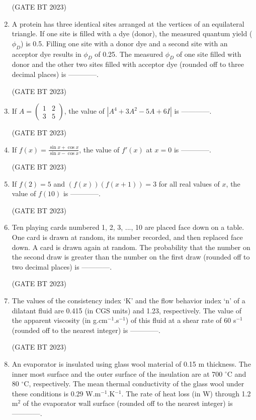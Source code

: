 \documentclass[journal,12pt,onecolumn]{IEEEtran}
\begin{document}
\begin{enumerate}
    \hfill(GATE BT 2023)

    \item A protein has three identical sites arranged at the vertices of an equilateral triangle. If one site is filled with a dye (donor), the measured quantum yield ($\phi_D$) is 0.5. Filling one site with a donor dye and a second site with an acceptor dye results in $\phi_D$ of 0.25. The measured $\phi_D$ of one site filled with donor and the other two sites filled with acceptor dye (rounded off to three decimal places) is ------------.

    \hfill(GATE BT 2023)

    \item If $A = \begin{pmatrix} 1 & 2 \\ 3 & 5 \end{pmatrix}$, the value of $|A^4 + 3A^2 - 5A + 6I|$ is ------------.

    \hfill(GATE BT 2023)

    \item If $f(x) = \frac{\sin x + \cos x}{\sin x - \cos x}$, the value of $f'(x)$ at $x = 0$ is ------------.

    \hfill(GATE BT 2023)

    \item If $f(2) = 5$ and $(f(x))(f(x+1)) = 3$ for all real values of $x$, the value of $f(10)$ is ------------.

    \hfill(GATE BT 2023)

    \item Ten playing cards numbered 1, 2, 3, ..., 10 are placed face down on a table. One card is drawn at random, its number recorded, and then replaced face down. A card is drawn again at random. The probability that the number on the second draw is greater than the number on the first draw (rounded off to two decimal places) is ------------.

    \hfill(GATE BT 2023)

    \item The values of the consistency index ‘K’ and the flow behavior index ‘n’ of a dilatant fluid are 0.415 (in CGS units) and 1.23, respectively. The value of the apparent viscosity (in g.cm$^{-1}$.s$^{-1}$) of this fluid at a shear rate of 60 s$^{-1}$ (rounded off to the nearest integer) is ------------.

    \hfill(GATE BT 2023)

    \item An evaporator is insulated using glass wool material of 0.15 m thickness. The inner most surface and the outer surface of the insulation are at 700 $^\circ$C and 80 $^\circ$C, respectively. The mean thermal conductivity of the glass wool under these conditions is 0.29 W.m$^{-1}$.K$^{-1}$. The rate of heat loss (in W) through 1.2 m$^2$ of the evaporator wall surface (rounded off to the nearest integer) is ------------.


\end{enumerate}
\end{document}
